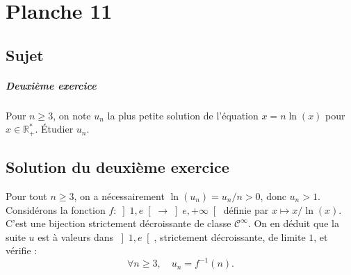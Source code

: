 \chapter{Planche 11}

\section{Sujet}

\paragraph{Deuxième exercice}
Pour $n \geqslant 3$, on note $u_n$ la plus petite solution de l'équation $x = n \ln(x)$ pour $x \in \mathbb R_+^*$. Étudier $u_n$.

\section{Solution du deuxième exercice}

Pour tout $n \geqslant 3$, on a nécessairement $\ln(u_n) = u_n/n > 0$, donc $u_n > 1$.
Considérons la fonction $f : \left]1,e\right[ \to \left]e,+\infty\right[$ définie par $x \mapsto x/{\ln(x)}$.
C'est une bijection strictement décroissante de classe $\mathscr C^\infty$.
On en déduit que la suite $u$ est à valeurs dans $\left]1,e\right[$, strictement décroissante, de limite $1$, et vérifie :
\[
\forall n\geqslant 3,\quad u_n = f^{-1}(n).
\]

